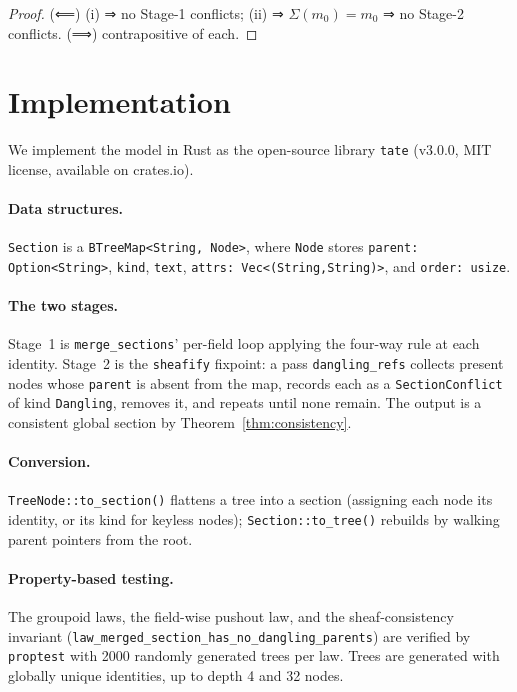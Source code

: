 \documentclass[11pt,a4paper]{article}
\begin{document}
\begin{proof}
(⟸) (i) ⇒ no Stage-1 conflicts; (ii) ⇒ $\Sigma(m_0)=m_0$ ⇒ no Stage-2
conflicts. (⟹) contrapositive of each.
\end{proof}


\section{Implementation}
\label{sec:impl}

We implement the model in Rust as the open-source library \texttt{tate}
(v3.0.0, MIT license, available on crates.io).

\paragraph{Data structures.} \texttt{Section} is a
\texttt{BTreeMap<String, Node>}, where \texttt{Node} stores
\texttt{parent: Option<String>}, \texttt{kind}, \texttt{text},
\texttt{attrs: Vec<(String,String)>}, and \texttt{order: usize}.

\paragraph{The two stages.} Stage~1 is \texttt{merge\_sections}' per-field
loop applying the four-way rule at each identity. Stage~2 is the
\texttt{sheafify} fixpoint: a pass \texttt{dangling\_refs} collects present
nodes whose \texttt{parent} is absent from the map, records each as a
\texttt{SectionConflict} of kind \texttt{Dangling}, removes it, and repeats
until none remain. The output is a consistent global section by
Theorem~\ref{thm:consistency}.

\paragraph{Conversion.} \texttt{TreeNode::to\_section()} flattens a tree
into a section (assigning each node its identity, or its kind for keyless
nodes); \texttt{Section::to\_tree()} rebuilds by walking parent pointers
from the root.

\paragraph{Property-based testing.} The groupoid laws, the field-wise
pushout law, and the sheaf-consistency invariant
(\texttt{law\_merged\_section\_has\_no\_dangling\_parents}) are verified
by \texttt{proptest} with 2000 randomly generated trees per law. Trees are
generated with globally unique identities, up to depth 4 and 32 nodes.
\end{document}
